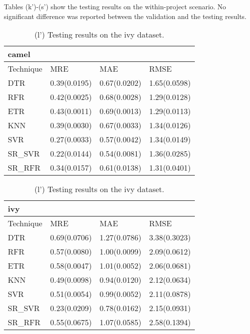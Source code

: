 \documentclass[]{article}
\begin{document}
\break
\FloatBarrier
Tables (k')-(s') show the testing results on the within-project scenario. No significant difference was reported between the validation and the testing results.\\
\FloatBarrier
\FloatBarrier
	\begin{table}[h]
	\captionsetup[subtable]{labelformat=empty}
	\begin{adjustwidth}{-3.4cm}{}
		\begin{subtable}{9.5cm}
			\centering
			\caption{(k') Testing results on the camel dataset.}
			\label{tab:xalan-wv}
			\begin{tabular}{llll}
				\hline
				camel &              &              &              \\ \hline
				Technique & MRE          & MAE          & RMSE         \\ \hline
				DTR       & 0.39(0.0195) & 0.67(0.0202) & 1.65(0.0598) \\
				RFR       & 0.42(0.0025) & 0.68(0.0028) & 1.29(0.0128) \\
				ETR       & 0.43(0.0011) & 0.69(0.0013) & 1.29(0.0113) \\
				KNN       & 0.39(0.0030) & 0.67(0.0033) & 1.34(0.0126) \\
				SVR       & 0.27(0.0033) & 0.57(0.0042) & 1.34(0.0149) \\
				SR\_SVR    & 0.22(0.0144) & 0.54(0.0081) & 1.36(0.0285) \\
				SR\_RFR    & 0.34(0.0157) & 0.61(0.0138) & 1.31(0.0401) \\ \hline
			\end{tabular}
		\end{subtable}
		\begin{subtable}{9.5cm}
			\centering
			\caption{(l') Testing results on the ivy dataset.}
			\label{tab:xerces-wv}
			\begin{tabular}{llll}
				\hline
				ivy   &              &              &              \\ \hline
				Technique & MRE          & MAE          & RMSE         \\ \hline
				DTR       & 0.69(0.0706) & 1.27(0.0786) & 3.38(0.3023) \\
				RFR       & 0.57(0.0080) & 1.00(0.0099) & 2.09(0.0612) \\
				ETR       & 0.58(0.0047) & 1.01(0.0052) & 2.06(0.0681) \\
				KNN       & 0.49(0.0098) & 0.94(0.0120) & 2.12(0.0634) \\
				SVR       & 0.51(0.0054) & 0.99(0.0052) & 2.11(0.0878) \\
				SR\_SVR    & 0.23(0.0209) & 0.78(0.0162) & 2.15(0.0931) \\
				SR\_RFR    & 0.55(0.0675) & 1.07(0.0585) & 2.58(0.1394) \\ \hline
			\end{tabular}
		\end{subtable} 
	\end{adjustwidth}
\end{table}
\end{document}
